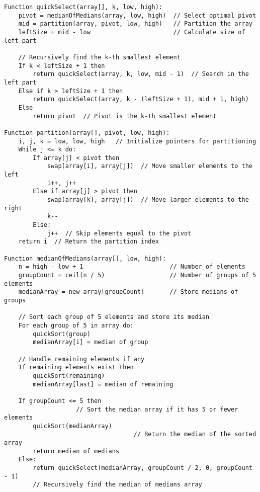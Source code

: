 \documentclass[a4paper,12pt]{report}
\begin{document}
\begin{tcolorbox}[colback=white, colframe=black, boxrule=0.5pt]
\ttfamily\small
\begin{verbatim}
Function quickSelect(array[], k, low, high):
    pivot = medianOfMedians(array, low, high)  // Select optimal pivot
    mid = partition(array, pivot, low, high)   // Partition the array
    leftSize = mid - low                       // Calculate size of left part

    // Recursively find the k-th smallest element
    If k < leftSize + 1 then
        return quickSelect(array, k, low, mid - 1)  // Search in the left part
    Else if k > leftSize + 1 then
        return quickSelect(array, k - (leftSize + 1), mid + 1, high) 
    Else
        return pivot  // Pivot is the k-th smallest element

Function partition(array[], pivot, low, high):
    i, j, k = low, low, high   // Initialize pointers for partitioning
    While j <= k do:
        If array[j] < pivot then
            swap(array[i], array[j])  // Move smaller elements to the left
            i++, j++
        Else if array[j] > pivot then
            swap(array[k], array[j])  // Move larger elements to the right
            k--
        Else:
            j++  // Skip elements equal to the pivot
    return i  // Return the partition index

Function medianOfMedians(array[], low, high):
    n = high - low + 1                        // Number of elements
    groupCount = ceil(n / 5)                  // Number of groups of 5 elements
    medianArray = new array[groupCount]       // Store medians of groups

    // Sort each group of 5 elements and store its median
    For each group of 5 in array do:
        quickSort(group)
        medianArray[i] = median of group

    // Handle remaining elements if any
    If remaining elements exist then
        quickSort(remaining)
        medianArray[last] = median of remaining

    If groupCount <= 5 then
					// Sort the median array if it has 5 or fewer elements
        quickSort(medianArray)  
	 								// Return the median of the sorted array                  
        return median of medians                 
    Else:
        return quickSelect(medianArray, groupCount / 2, 0, groupCount - 1)  
        // Recursively find the median of medians array

\end{verbatim}
\end{tcolorbox}
\end{document}
